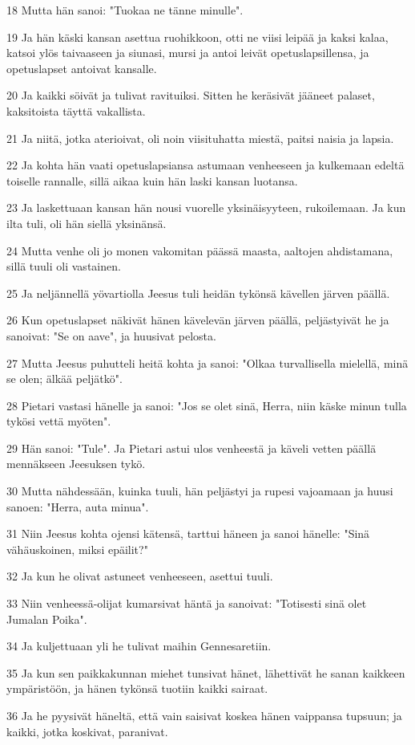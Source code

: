 \par 18 Mutta hän sanoi: "Tuokaa ne tänne minulle".
\par 19 Ja hän käski kansan asettua ruohikkoon, otti ne viisi leipää ja kaksi kalaa, katsoi ylös taivaaseen ja siunasi, mursi ja antoi leivät opetuslapsillensa, ja opetuslapset antoivat kansalle.
\par 20 Ja kaikki söivät ja tulivat ravituiksi. Sitten he keräsivät jääneet palaset, kaksitoista täyttä vakallista.
\par 21 Ja niitä, jotka aterioivat, oli noin viisituhatta miestä, paitsi naisia ja lapsia.
\par 22 Ja kohta hän vaati opetuslapsiansa astumaan venheeseen ja kulkemaan edeltä toiselle rannalle, sillä aikaa kuin hän laski kansan luotansa.
\par 23 Ja laskettuaan kansan hän nousi vuorelle yksinäisyyteen, rukoilemaan. Ja kun ilta tuli, oli hän siellä yksinänsä.
\par 24 Mutta venhe oli jo monen vakomitan päässä maasta, aaltojen ahdistamana, sillä tuuli oli vastainen.
\par 25 Ja neljännellä yövartiolla Jeesus tuli heidän tykönsä kävellen järven päällä.
\par 26 Kun opetuslapset näkivät hänen kävelevän järven päällä, peljästyivät he ja sanoivat: "Se on aave", ja huusivat pelosta.
\par 27 Mutta Jeesus puhutteli heitä kohta ja sanoi: "Olkaa turvallisella mielellä, minä se olen; älkää peljätkö".
\par 28 Pietari vastasi hänelle ja sanoi: "Jos se olet sinä, Herra, niin käske minun tulla tykösi vettä myöten".
\par 29 Hän sanoi: "Tule". Ja Pietari astui ulos venheestä ja käveli vetten päällä mennäkseen Jeesuksen tykö.
\par 30 Mutta nähdessään, kuinka tuuli, hän peljästyi ja rupesi vajoamaan ja huusi sanoen: "Herra, auta minua".
\par 31 Niin Jeesus kohta ojensi kätensä, tarttui häneen ja sanoi hänelle: "Sinä vähäuskoinen, miksi epäilit?"
\par 32 Ja kun he olivat astuneet venheeseen, asettui tuuli.
\par 33 Niin venheessä-olijat kumarsivat häntä ja sanoivat: "Totisesti sinä olet Jumalan Poika".
\par 34 Ja kuljettuaan yli he tulivat maihin Gennesaretiin.
\par 35 Ja kun sen paikkakunnan miehet tunsivat hänet, lähettivät he sanan kaikkeen ympäristöön, ja hänen tykönsä tuotiin kaikki sairaat.
\par 36 Ja he pyysivät häneltä, että vain saisivat koskea hänen vaippansa tupsuun; ja kaikki, jotka koskivat, paranivat.

